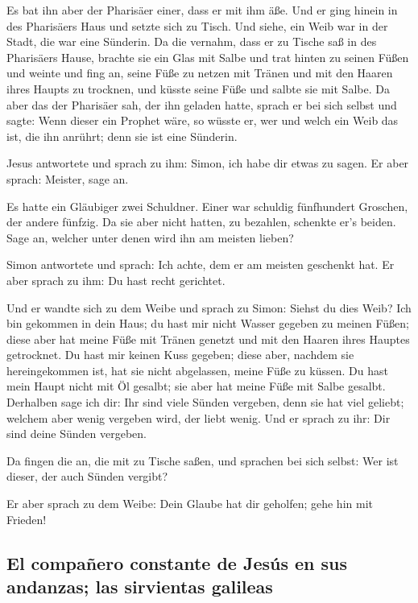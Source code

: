  Es bat ihn aber der Pharisäer einer, dass er mit ihm
äße. Und er ging hinein in des Pharisäers Haus und setzte sich zu Tisch.
 Und siehe, ein Weib war in der Stadt, die war eine
Sünderin. Da die vernahm, dass er zu Tische saß in des Pharisäers Hause,
brachte sie ein Glas mit Salbe  und trat hinten zu seinen
Füßen und weinte und fing an, seine Füße zu netzen mit Tränen und mit
den Haaren ihres Haupts zu trocknen, und küsste seine Füße und salbte
sie mit Salbe.  Da aber das der Pharisäer sah, der ihn
geladen hatte, sprach er bei sich selbst und sagte: Wenn dieser ein
Prophet wäre, so wüsste er, wer und welch ein Weib das ist, die ihn
anrührt; denn sie ist eine Sünderin.

 Jesus antwortete und sprach zu ihm: Simon, ich habe dir
etwas zu sagen. Er aber sprach: Meister, sage an.

 Es hatte ein Gläubiger zwei Schuldner. Einer war
schuldig fünfhundert Groschen, der andere fünfzig.  Da
sie aber nicht hatten, zu bezahlen, schenkte er's beiden. Sage an,
welcher unter denen wird ihn am meisten lieben?

 Simon antwortete und sprach: Ich achte, dem er am
meisten geschenkt hat. Er aber sprach zu ihm: Du hast recht gerichtet.

 Und er wandte sich zu dem Weibe und sprach zu Simon:
Siehst du dies Weib? Ich bin gekommen in dein Haus; du hast mir nicht
Wasser gegeben zu meinen Füßen; diese aber hat meine Füße mit Tränen
genetzt und mit den Haaren ihres Hauptes getrocknet.  Du
hast mir keinen Kuss gegeben; diese aber, nachdem sie hereingekommen
ist, hat sie nicht abgelassen, meine Füße zu küssen.  Du
hast mein Haupt nicht mit Öl gesalbt; sie aber hat meine Füße mit Salbe
gesalbt.  Derhalben sage ich dir: Ihr sind viele Sünden
vergeben, denn sie hat viel geliebt; welchem aber wenig vergeben wird,
der liebt wenig.  Und er sprach zu ihr: Dir sind deine
Sünden vergeben.

 Da fingen die an, die mit zu Tische saßen, und sprachen
bei sich selbst: Wer ist dieser, der auch Sünden vergibt?

 Er aber sprach zu dem Weibe: Dein Glaube hat dir
geholfen; gehe hin mit Frieden!

\hypertarget{el-compauxf1ero-constante-de-jesuxfas-en-sus-andanzas-las-sirvientas-galileas}{%
\subsection{El compañero constante de Jesús en sus andanzas; las
sirvientas
galileas}\label{el-compauxf1ero-constante-de-jesuxfas-en-sus-andanzas-las-sirvientas-galileas}}

